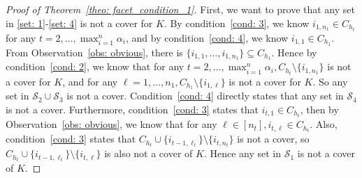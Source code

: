 \begin{appendices}
\begin{proof}[Proof of Theorem~\ref{theo: facet_condition_1}]
First, we want to prove that any set in \eqref{set: 1}-\eqref{set: 4} is not a cover for $K$. 
By condition~\ref{cond: 3}, we know $i_{1,n_1} \in C_{h_t}$ for any $t = 2, \ldots,  \max_{i=1}^n \alpha_i$, and by condition~\ref{cond: 4}, we know $i_{1,1} \in C_{h_1}$. 
From Observation~\ref{obs: obvious}, there is $\{i_{1,1}, \ldots, i_{1, n_1}\} \subseteq C_{h_1}$.
Hence by condition~\ref{cond: 2}, we know that for any $t = 2, \ldots,  \max_{i=1}^n \alpha_i, C_{h_t} \setminus \{i_{1,n_1}\}$ is not a cover for $K$, and for any $\ell = 1, \ldots, n_1, C_{h_1} \setminus \{i_{1,\ell}\}$ is not a cover for $K$. So any set in $\mathscr{S}_2 \cup \mathscr{S}_3$ is not a cover. Condition~\ref{cond: 4} directly states that any set in $\mathscr{S}_4$ is not a cover. Furthermore, condition~\ref{cond: 3} states that $i_{t,1} \in C_{h_t}$, then by Observation~\ref{obs: obvious},
we know that for any $\ell \in [n_t], i_{t, \ell} \in C_{h_t}$. Also, condition~\ref{cond: 3} states that $C_{h_t} \cup \{i_{t-1, \ell_t}\} \setminus \{i_{t, n_t}\}$ is not a cover, so $C_{h_t} \cup \{i_{t-1, \ell_t}\} \setminus \{i_{t,\ell}\}$ is also not a cover of $K$.
Hence any set in $\mathscr{S}_1$ is not a cover of $K$. 


\end{proof}
\end{appendices}
